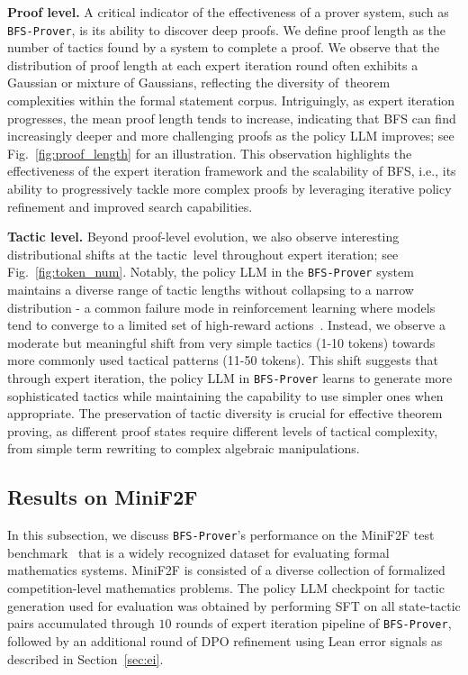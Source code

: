 \documentclass[10pt,english]{article}
\begin{document}
\textbf{Proof level.} A critical indicator of the effectiveness of a prover system, such as \texttt{BFS-Prover}, is its ability to discover deep proofs. We define proof length as the number of tactics found by a system to complete a proof. We observe that the distribution of proof length at each expert iteration round often exhibits a Gaussian or mixture of Gaussians, reflecting the diversity of~theorem complexities within the formal statement corpus. Intriguingly, as expert iteration progresses, the mean proof length tends to increase, indicating that BFS can find increasingly deeper and more challenging proofs as the policy LLM improves; see Fig.~\ref{fig:proof_length} for an illustration. This observation highlights the effectiveness of the expert iteration framework and the scalability of BFS, i.e., its ability to progressively tackle more complex proofs by leveraging iterative policy refinement and improved search capabilities.

\textbf{Tactic level.} Beyond proof-level evolution, we also observe interesting distributional shifts at the tactic~level throughout expert iteration; see Fig.~\ref{fig:token_num}. Notably, the policy LLM in the \texttt{BFS-Prover} system maintains a diverse range of tactic lengths without collapsing to a narrow distribution - a common failure mode in reinforcement learning where models tend to converge to a limited set of high-reward actions~\citep{sutton2018reinforcement}. Instead, we observe a moderate but meaningful shift from very simple tactics (1-10 tokens) towards more commonly used tactical patterns (11-50 tokens). This shift suggests that through expert iteration, the policy LLM in \texttt{BFS-Prover} learns to generate more sophisticated tactics while maintaining the capability to use simpler ones when appropriate. The preservation of tactic diversity is crucial for effective theorem proving, as different proof states require different levels of tactical complexity, from simple term rewriting to complex algebraic manipulations.


\subsection{Results on MiniF2F}
In this subsection, we discuss \texttt{BFS-Prover}'s performance on the MiniF2F test benchmark~\citep{minif2f} that is a widely recognized dataset for evaluating formal mathematics systems. MiniF2F is consisted of a diverse collection of formalized competition-level mathematics problems. The policy LLM checkpoint for tactic generation used for evaluation was obtained by performing SFT on all state-tactic pairs accumulated through $10$ rounds of expert iteration pipeline of \texttt{BFS-Prover}, followed by an additional round of DPO refinement using Lean error signals as described in Section~\ref{sec:ei}.
\end{document}
